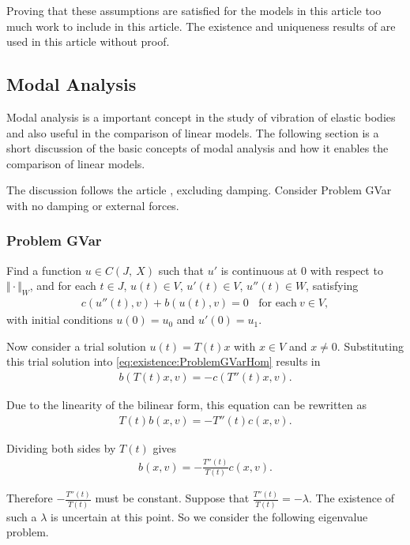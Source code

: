 		Proving that these assumptions are satisfied for the models in this article too much work to include in this article. The existence and uniqueness results of \cite{VV02} are used in this article without proof.

	\subsection*{Modal Analysis}
		Modal analysis is a important concept in the study of vibration of elastic bodies and also useful in the comparison of linear models. The following section is a short discussion of the basic concepts of modal analysis and how it enables the comparison of linear models.

		The discussion follows the article \cite{CVV18}, excluding damping. Consider Problem GVar with no damping or external forces.

		\subsubsection*{Problem GVar}\label{sssec:existence:ProblemGVar}
		Find a function $u \in C(J,\ X)$ such that $u'$ is continuous at $0$ with respect to $\Vert \cdot \Vert_{W}$, and for each $t \in J$, $u(t) \in V$, $u'(t) \in V$, $u''(t) \in W$, satisfying
		\begin{eqnarray}
		c(u''(t),v)+b(u(t),v) = 0 \ \ \ \ \textrm{for each} \ v \in V, \label{eq:existence:ProblemGVarHom}
		\end{eqnarray}
		with initial conditions $u(0) = u_0$ and $u'(0) = u_1$.

		Now consider a trial solution $u(t) = T(t)x$ with $x \in V$ and $x \neq 0$. Substituting this trial solution into \eqref{eq:existence:ProblemGVarHom} results in
		\begin{eqnarray*}
			b(T(t)x,v) = - c(T''(t)x,v).  \label{eq:existence:ProblemGVarHom:Substitution}
		\end{eqnarray*}

		Due to the linearity of the bilinear form, this equation can be rewritten as
		\begin{eqnarray*}
			T(t)b(x,v) = - T''(t)c(x,v).
		\end{eqnarray*}

		Dividing both sides by $T(t)$ gives
		\begin{eqnarray*}
			b(x,v) = - \frac{T''(t)}{T(t)}c(x,v).
		\end{eqnarray*}

		Therefore $\displaystyle -\frac{T''(t)}{T(t)}$ must be constant. Suppose that $\displaystyle \frac{T''(t)}{T(t)} = -\lambda$. The existence of such a $\lambda$ is uncertain at this point. So we consider the following eigenvalue problem.

